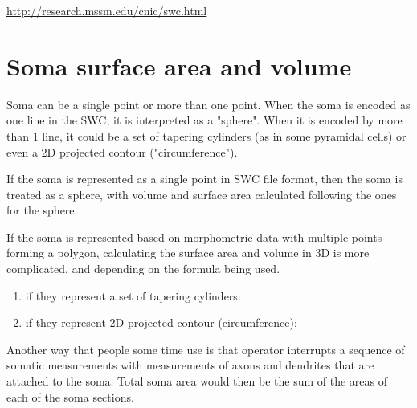\url{http://research.mssm.edu/cnic/swc.html}

\section{Soma surface area and volume}

Soma can be a single point or more than one point. When the soma is encoded as
one line in the SWC, it is interpreted as a "sphere". When it is encoded by more
than 1 line, it could be a set of tapering cylinders (as in some pyramidal
cells) or even a 2D projected contour ("circumference").


If the soma is represented as a single point in SWC file format, then 
the soma is treated as a sphere, with volume and surface area calculated
following the ones for the sphere.

If the soma is represented based on morphometric data with multiple points
forming a polygon, calculating the surface area and volume in 3D is more
complicated, and depending on the formula being used.
\begin{enumerate}
  \item if they represent a set of tapering cylinders: 
  
  
  \item if they represent 2D projected contour (circumference): 
\end{enumerate} 

Another way that people some time use is that operator interrupts a sequence of
somatic measurements with measurements of axons and dendrites that are attached
to the soma. Total soma area would then be the sum of the areas of each of the
soma sections.

